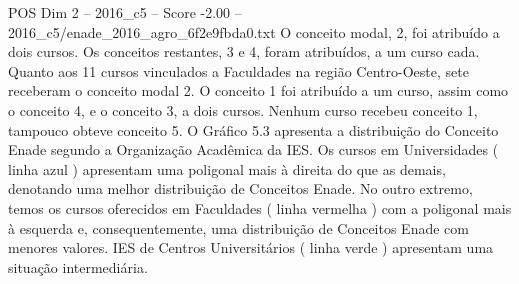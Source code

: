 \begin{textsample}{POS Dim 2 – 2016\_c5 – Score -2.00 – 2016\_c5/enade\_2016\_agro\_6f2e9fbda0.txt}
O conceito modal, 2, foi atribuído a dois cursos.
Os conceitos restantes, 3 e 4, foram atribuídos, a um curso cada.
Quanto aos 11 cursos vinculados a Faculdades na região Centro-Oeste, sete receberam o conceito modal 2.
O conceito 1 foi atribuído a um curso, assim como o conceito 4, e o conceito 3, a dois cursos.
Nenhum curso recebeu conceito 1, tampouco obteve conceito 5.
O Gráfico 5.3 apresenta a distribuição do Conceito Enade segundo a Organização Acadêmica da IES.
Os cursos em Universidades ( linha azul ) apresentam uma poligonal mais à direita do que as demais, denotando uma melhor distribuição de Conceitos Enade.
No outro extremo, temos os cursos oferecidos em Faculdades ( linha vermelha ) com a poligonal mais à esquerda e, consequentemente, uma distribuição de Conceitos Enade com menores valores.
IES de Centros Universitários ( linha verde ) apresentam uma situação intermediária.

\end{textsample}
